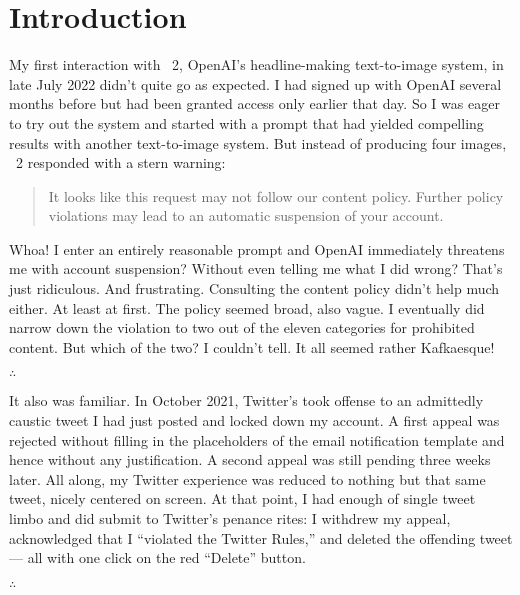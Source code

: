 
\section{Introduction}
\label{sec:introduction}

My first interaction with \DALLE~2, OpenAI's headline-making text-to-image
system, in late July 2022 didn't quite go as expected. I had signed up with
OpenAI several months before but had been granted access only earlier that day.
So I was eager to try out the system and started with a prompt that had yielded
compelling results with another text-to-image system. But instead of producing
four images, \DALLE~2 responded with a stern warning:

\begin{quote}
\openfatdquo{}It looks like this request may not follow our content policy.
Further policy violations may lead to an automatic suspension of your
account.\closefatdquo{}
\end{quote}

\noindent Whoa! I enter an entirely reasonable prompt and OpenAI immediately
threatens me with account suspension? Without even telling me what I did wrong?
That's just ridiculous. And frustrating. Consulting the content policy didn't
help much either. At least at first. The policy seemed broad, also vague. I
eventually did narrow down the violation to two out of the eleven categories for
prohibited content. But which of the two? I couldn't tell. It all seemed rather
Kafkaesque!

\begin{center}$\bm\therefore$\end{center}

It also was familiar. In October 2021, Twitter's \AI{} took offense to an
admittedly caustic tweet I had just posted and locked down my account. A first
appeal was rejected without filling in the placeholders of the email
notification template and hence without any justification. A second appeal was
still pending three weeks later. All along, my Twitter experience was reduced to
nothing but that same tweet, nicely centered on screen. At that point, I had
enough of single tweet limbo and did submit to Twitter's penance rites: I
withdrew my appeal, acknowledged that I ``violated the Twitter Rules,'' and
deleted the offending tweet --- all with one click on the red ``Delete'' button.

\begin{center}$\therefore$\end{center}

